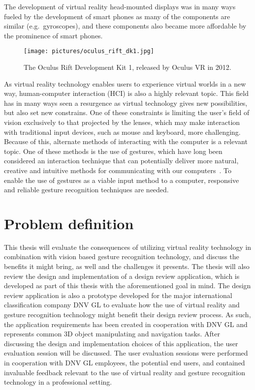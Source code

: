 The development of virtual reality head-mounted displays was in many ways fueled by the development of smart phones as many of the components are similar (e.g.~gyroscopes), and
these components also became more affordable by the prominence of smart phones. 

\begin{figure}%
	\texttt{[image: pictures/oculus\_rift\_dk1.jpg]}
	\caption[The Oculus Rift Development Kit 1]{The Oculus Rift Development Kit 1, released by Oculus VR in 2012.}
	\label{fig:oculus}
\end{figure}

As virtual reality technology enables users to experience virtual worlds in a new way, 
human-computer interaction (HCI) is also a highly relevant topic. 
This field has in many ways seen a resurgence as virtual technology gives new possibilities, but also set new constrains. 
One of these constraints is limiting the user's field of vision exclusively to that projected by the lenses, 
which may make interaction with traditional input devices, such as mouse and keyboard, more challenging. 
Because of this, alternate methods of interacting with the computer is a relevant topic. 
One of these methods is the use of gestures, 
which have long been considered an interaction technique that can potentially deliver more natural, 
creative and intuitive methods for communicating with our computers~\citep{Rautaray2015}. 
To enable the use of gestures as a viable input method to a computer, responsive and reliable gesture recognition techniques are needed.  

\section{Problem definition}
This thesis will evaluate the consequences of utilizing virtual reality technology in combination with vision based gesture recognition technology, and discuss the benefits it 
might bring, as well and the challenges it presents. 
The thesis will also review the design and implementation of a design review application, which is developed as part of this thesis with the aforementioned goal in mind. 
The design review application is also a prototype developed for the major international classification company DNV GL to evaluate how the use of virtual reality and gesture
recognition technology might benefit their design review process. As such, the application requirements has been created in cooperation with DNV GL and represents
common 3D object manipulating and navigation tasks. After discussing the design and implementation choices of this application, the user evaluation session will be discussed. 
The user evaluation sessions were performed in cooperation with DNV GL employees, the potential end users, and contained invaluable feedback relevant to the use of virtual reality and gesture
recognition technology in a professional setting. 

